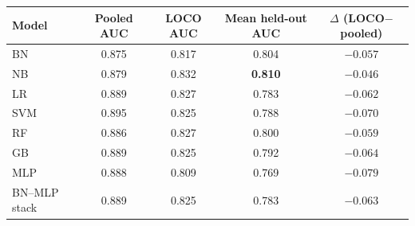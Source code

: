 \begin{tabular}{lcccc}
\toprule
Model & Pooled AUC & LOCO AUC & Mean held-out AUC & $\Delta$ (LOCO$-$pooled) \\
\midrule
BN & 0.875 & 0.817 & 0.804 & $-0.057$ \\
NB & 0.879 & 0.832 & \textbf{0.810} & $-0.046$ \\
LR & 0.889 & 0.827 & 0.783 & $-0.062$ \\
SVM & 0.895 & 0.825 & 0.788 & $-0.070$ \\
RF & 0.886 & 0.827 & 0.800 & $-0.059$ \\
GB & 0.889 & 0.825 & 0.792 & $-0.064$ \\
\midrule
MLP & 0.888 & 0.809 & 0.769 & $-0.079$ \\
BN--MLP stack & 0.889 & 0.825 & 0.783 & $-0.063$ \\
\bottomrule
\end{tabular}
